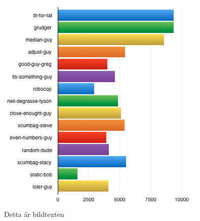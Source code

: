 \begin{figure}[htb]
	\begin{center}
	\includegraphics[scale=0.75, angle=0]{bilder/wins.png}
	\caption{Detta är bildtexten}
	\label{EXECFLOW}
	\end{center}
\end{figure}